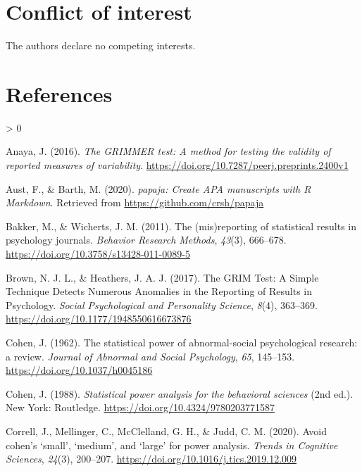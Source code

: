 \documentclass[
  english,
  man, donotrepeattitle,floatsintext]{apa7}
\newlength{\cslhangindent}
\newenvironment{CSLReferences}[2] %
 {%
  \setlength{\parindent}{0pt}
  \ifodd #1 \everypar{\setlength{\hangindent}{\cslhangindent}}\ignorespaces\fi
  \ifnum #2 > 0
  \setlength{\parskip}{#2\baselineskip}
  \fi
 }%
 {}
\begin{document}
\hypertarget{conflict-of-interest}{%
\section{Conflict of interest}\label{conflict-of-interest}}

The authors declare no competing interests.

\hypertarget{references}{%
\section{References}\label{references}}

\begingroup
\setlength{\parindent}{-0.5in}
\setlength{\leftskip}{0.5in}

\endgroup

\hypertarget{refs}{}
\begin{CSLReferences}{1}{0}
\leavevmode\hypertarget{ref-anaya2016}{}%
Anaya, J. (2016). \emph{The GRIMMER test: A method for testing the validity of reported measures of variability}. \url{https://doi.org/10.7287/peerj.preprints.2400v1}

\leavevmode\hypertarget{ref-R-papaja}{}%
Aust, F., \& Barth, M. (2020). \emph{{papaja}: {Create} {APA} manuscripts with {R Markdown}}. Retrieved from \url{https://github.com/crsh/papaja}

\leavevmode\hypertarget{ref-bakker2011}{}%
Bakker, M., \& Wicherts, J. M. (2011). The (mis)reporting of statistical results in psychology journals. \emph{Behavior Research Methods}, \emph{43}(3), 666--678. \url{https://doi.org/10.3758/s13428-011-0089-5}

\leavevmode\hypertarget{ref-brown2017}{}%
Brown, N. J. L., \& Heathers, J. A. J. (2017). The GRIM Test: A Simple Technique Detects Numerous Anomalies in the Reporting of Results in Psychology. \emph{Social Psychological and Personality Science}, \emph{8}(4), 363--369. \url{https://doi.org/10.1177/1948550616673876}

\leavevmode\hypertarget{ref-cohen1962}{}%
Cohen, J. (1962). The statistical power of abnormal-social psychological research: a review. \emph{Journal of Abnormal and Social Psychology}, \emph{65}, 145--153. \url{https://doi.org/10.1037/h0045186}

\leavevmode\hypertarget{ref-cohen1988}{}%
Cohen, J. (1988). \emph{Statistical power analysis for the behavioral sciences} (2nd ed.). New York: Routledge. \url{https://doi.org/10.4324/9780203771587}

\leavevmode\hypertarget{ref-correll2020}{}%
Correll, J., Mellinger, C., McClelland, G. H., \& Judd, C. M. (2020). Avoid cohen{'}s {`}small{'}, {`}medium{'}, and {`}large{'} for power analysis. \emph{Trends in Cognitive Sciences}, \emph{24}(3), 200--207. \url{https://doi.org/10.1016/j.tics.2019.12.009}


\end{CSLReferences}
\end{document}
